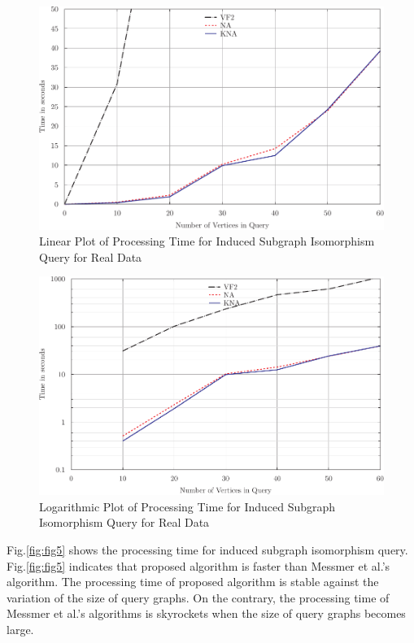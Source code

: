 \begin{figure}[h]
\centering
\centerline{\includegraphics{images/kna_inducedR}}
\caption{Linear Plot of Processing Time for Induced Subgraph Isomorphism Query for Real Data}
\label{fig:fig7}
\end{figure}

\begin{figure}[h]
\centering
\centerline{\includegraphics{images/kna_induced_logR}}
\caption{Logarithmic Plot of Processing Time for Induced Subgraph Isomorphism Query for Real Data}
\label{fig:fig8}
\end{figure}


Fig.\ref{fig:fig5} shows the processing time for induced subgraph isomorphism query.
Fig.\ref{fig:fig5} indicates that proposed algorithm is faster than Messmer et al.'s algorithm.
The processing time of proposed algorithm is stable against the variation of the size of query graphs.
On the contrary, the processing time of Messmer et al.'s algorithms is skyrockets when the size of query graphs becomes large.

